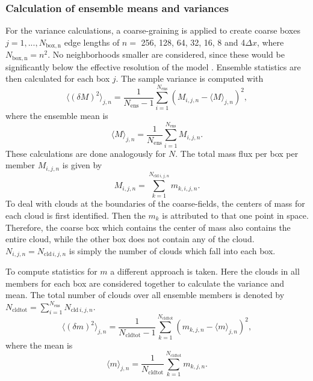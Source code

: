 \documentclass[a4paper, 12pt, draft]{article}
\begin{document}
\subsubsection{Calculation of ensemble means and variances}
For the variance calculations, a coarse-graining is applied to create coarse boxes $j=1,...,N_{\mathrm{box,n}}$ edge lengths of $n=$ 256, 128, 64, 32, 16, 8 and 4$\Delta x$, where $N_{\mathrm{box,n}}=n^2$. No neighborhoods smaller are considered, since these would be significantly below the effective resolution of the model \citep{Bierdel2012}. Ensemble statistics are then calculated for each box $j$. The sample variance is computed with
\begin{equation} \label{eq:calc_varM}
 \langle (\delta M )^2 \rangle_{j,n} = \frac{1}{N_{\mathrm{ens}}-1} \sum_{i=1}^{N_{\mathrm{ens}}} (M_{i,j,n} - \langle M \rangle_{j,n})^2,
\end{equation}
where the ensemble mean is
\begin{equation} \label{eq:calc_meanM}
 \langle M \rangle_{j,n} = \frac{1}{N_{\mathrm{ens}}} \sum_{i=1}^{N_{\mathrm{ens}}} M_{i,j,n}.
\end{equation}
These calculations are done analogously for $N$. The total mass flux per box per member $M_{i,j,n}$ is given by
\begin{equation} \label{eq:calc_memM}
 M_{i,j,n} = \sum_{k=1}^{N_{\mathrm{cld}\,i,j,n}} m_{k,i,j,n}.
\end{equation}
To deal with clouds at the boundaries of the coarse-fields, the centers of mass for each cloud is first identified. Then the $m_k$ is attributed to that one point in space. Therefore, the coarse box which contains the center of mass also contains the entire cloud, while the other box does not contain any of the cloud. $N_{i,j,n}=N_{\mathrm{cld}\,i,j,n}$ is simply the number of clouds which fall into each box.

To compute statistics for $m$ a different approach is taken. Here the clouds in all members for each box are considered together to calculate the variance and mean. The total number of clouds over all ensemble members is denoted by $N_{\mathrm{cldtot}} = \sum_{i=1}^{N_{\mathrm{ens}}} N_{\mathrm{cld}\,i,j,n}$.
\begin{equation} \label{eq:calc_varm}
 \langle (\delta m )^2 \rangle_{j,n} = \frac{1}{N_{\mathrm{cldtot}}-1} \sum_{k=1}^{N_{\mathrm{cldtot}}} (m_{k,j,n} - \langle m \rangle_{j,n})^2,
\end{equation}
where the mean is
\begin{equation} \label{eq:calc_meanM}
 \langle m \rangle_{j,n} = \frac{1}{N_{\mathrm{cldtot}}} \sum_{k=1}^{N_{\mathrm{cldtot}}} m_{k,j,n}.
\end{equation}
\end{document}

